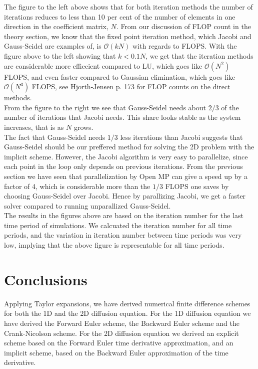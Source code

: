 \documentclass{article}
\begin{document}
The figure to the left above shows that for both iteration methods the number of iterations reduces to less than 10 per cent of the number of elements in one direction in the coefficient matrix, $N$. From our discussion of FLOP count in the theory section, we know that the fixed point iteration method, which Jacobi and Gauss-Seidel are examples of, is $\mathcal{O}(kN)$ with regards to FLOPS. With the figure above to the left showing that $k < 0.1N$, we get that the iteration methods are considerable more effiecient compared to LU, which goes like $\mathcal{O}(N^2)$ FLOPS, and even faster compared to Gaussian elimination, which goes like $\mathcal{O}(N^3)$ FLOPS, see Hjorth-Jensen \cite{MHJ} p. 173 for FLOP counts on the direct methods.\\

From the figure to the right we see that Gauss-Seidel needs about $2/3$ of the number of iterations that Jacobi needs. This share looks stable as the system increases, that is as $N$ grows.\\ 

The fact that Gauss-Seidel needs $1/3$ less iterations than Jacobi suggests that Gauss-Seidel should be our preffered method for solving the 2D problem with the implicit scheme. However, the Jacobi algorithm is very easy to parallelize, since each point in the loop only depends on previous iterations. From the previous section we have seen that parallelization by Open MP can give a speed up by a factor of 4, which is considerable more than the $1/3$ FLOPS one saves by choosing Gauss-Seidel over Jacobi. Hence by parallizing Jacobi, we get a faster solver compared to running unparallized Gauss-Seidel.\\

The results in the figures above are based on the iteration number for the last time period of simulations. We calcuated the iteration number for all time periods, and the variation in iteration number between time periods was very low, implying that the above figure is representable for all time periods.

\section{Conclusions}
Applying Taylor expansions, we have derived numerical finite difference schemes for both the 1D and the 2D diffusion equation. For the 1D diffusion equation we have derived the Forward Euler scheme, the Backward Euler scheme and the Crank-Nicolson scheme. For the 2D diffusion equation we derived an explicit scheme based on the Forward Euler time derivative approximation, and an implicit scheme, based on the Backward Euler approximation of the time derivative.\\
\end{document}
